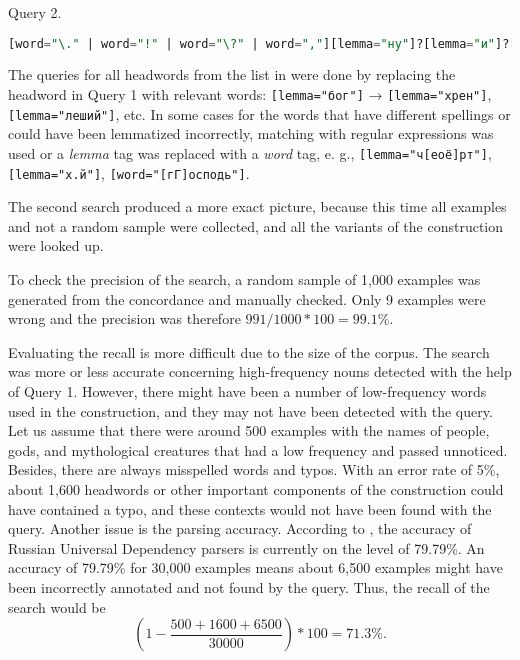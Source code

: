 \documentclass[output=paper]{langscibook}
\begin{document}
\ea
Query 2.
\begin{lstlisting}[language=SQL]
[word="\." | word="!" | word="\?" | word=","][lemma="ну"]?[lemma="и"]?[lemma="бог"][word="с" | word="со"][tag="P....i.*" | tag="N...i.*"][word="\." | word="!" | word="\?" | word=";" | word=","]
\end{lstlisting}
\z

The queries for all headwords from the list in  were done by replacing the headword in Query 1 with relevant words: \texttt{[lemma="бог"]} → \texttt{[lemma="хрен"]}, \texttt{[lemma="леший"]}, etc. In some cases for the words that have different spellings or could have been lemmatized incorrectly, matching with regular expressions was used or a \textit{lemma} tag was replaced with a \textit{word} tag, e. g., \texttt{[lemma="ч[е{\textbar}о{\textbar}ё]рт"]}, \texttt{[lemma="х.й"]}, \texttt{[word="[г{\textbar}Г]осподь"]}.

The second search produced a more exact picture, because this time all examples and not a random sample were collected, and all the variants of the construction were looked up.

To check the precision of the search, a random sample of 1,000 examples was generated from the concordance and manually checked. Only 9 examples were wrong and the precision was therefore $991/1000*100 = 99.1\%$.

Evaluating the recall is more difficult due to the size of the corpus. The search was more or less accurate concerning high-frequency nouns detected with the help of Query 1. However, there might have been a number of low-frequency words used in the construction, and they may not have been detected with the query. Let us assume that there were around 500 examples with the names of people, gods, and mythological creatures that had a low frequency and passed unnoticed. Besides, there are always misspelled words and typos. With an error rate of 5\%, about 1,600 headwords or other important components of the construction could have contained a typo, and these contexts would not have been found with the query. Another issue is the parsing accuracy. According to \citet{NivreFang2017}, the accuracy of Russian Universal Dependency parsers is currently on the level of 79.79\%. An accuracy of 79.79\% for 30,000 examples means about 6,500 examples might have been incorrectly annotated and not found by the query. Thus, the recall of the search would be  \[ \left(1-\frac{500+1600+6500}{30000}\right)*100 = 71.3\%.\] 
\end{document}
